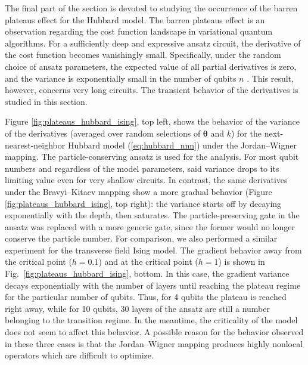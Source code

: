 The final part of the section is devoted to studying the occurrence of the barren plateaus effect for the Hubbard model. The barren plateaus effect is an observation regarding the cost function landscape in variational quantum algorithms. For a sufficiently deep and expressive ansatz circuit, the derivative of the cost function becomes vanishingly small. Specifically, under the random choice of ansatz parameters, the expected value of all partial derivatives is zero, and the variance is exponentially small in the number of qubits $n$ \cite{mcclean_barren_2018}. This result, however, concerns very long circuits. The transient behavior of the derivatives is studied in this section.

Figure \ref{fig:plateaus_hubbard_ising}, top left, shows the behavior of the variance of the derivatives (averaged over random selections of $\boldsymbol{\theta}$ and $k$) for the next-nearest-neighbor Hubbard model (\ref{eq:hubbard_nnn}) under the Jordan--Wigner mapping. The particle-conserving ansatz is used for the analysis. For most qubit numbers and regardless of the model parameters, said variance drops to its limiting value even for very shallow circuits. In contrast, the same derivatives under the Bravyi--Kitaev mapping show a more gradual behavior (Figure \ref{fig:plateaus_hubbard_ising}, top right): the variance starts off by decaying exponentially with the depth, then saturates. The particle-preserving gate in the ansatz was replaced with a more generic gate, since the former would no longer conserve the particle number.
For comparison, we also performed a similar experiment for the transverse field Ising model. The gradient behavior away from the critical point ($h = 0.1$) and at the critical point ($h = 1$) is shown in Fig.~\ref{fig:plateaus_hubbard_ising}, bottom. In this case, the gradient variance decays exponentially with the number of layers until reaching the plateau regime for the particular number of qubits. Thus, for 4 qubits the plateau is reached right away, while for 10 qubits, 30 layers of the ansatz are still a number belonging to the transition regime. In the meantime, the criticality of the model does not seem to affect this behavior. A possible reason for the behavior observed in these three cases is that the Jordan--Wigner mapping produces highly nonlocal operators which are difficult to optimize.

